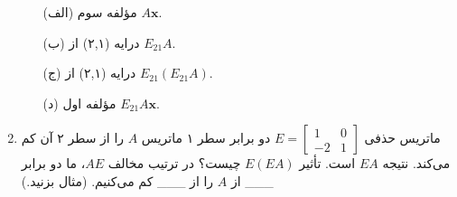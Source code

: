 \documentclass[12pt, a4paper]{book}
\begin{document}
\begin{enumerate}
\begin{itemize}
			\item[(الف)] مؤلفه سوم $A\mathbf{x}$.
			\item[(ب)] درایه (۲,۱) از $E_{21}A$.
			\item[(ج)] درایه (۲,۱) از $E_{21}(E_{21}A)$.
			\item[(د)] مؤلفه اول $E_{21}A\mathbf{x}$.
		\end{itemize}
		\item ماتریس حذفی $E = \begin{bmatrix} 1 & 0 \\ -2 & 1 \end{bmatrix}$ دو برابر سطر ۱ ماتریس $A$ را از سطر ۲ آن کم می‌کند. نتیجه $EA$ است. تأثیر $E(EA)$ چیست؟ در ترتیب مخالف $AE$، ما دو برابر \_\_\_ از $A$ را از \_\_\_ کم می‌کنیم. (مثال بزنید.)
	\end{enumerate}
	
\end{document}

